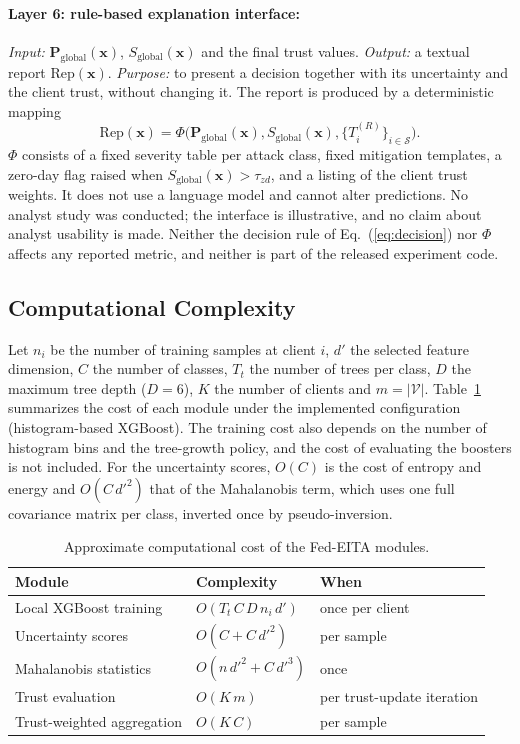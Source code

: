 \documentclass[pdflatex,sn-mathphys-num]{sn-jnl}
\begin{document}
{{\paragraph{Layer 6: rule-based explanation interface:} \emph{Input:} $\mathbf{P}_{\mathrm{global}}(\mathbf{x})$, $S_{\mathrm{global}}(\mathbf{x})$ and the final trust values. \emph{Output:} a textual report $\mathrm{Rep}(\mathbf{x})$. \emph{Purpose:} to present a decision together with its uncertainty and the client trust, without changing it. The report is produced by a deterministic mapping
\begin{equation}
\mathrm{Rep}(\mathbf{x})=\Phi\big(\mathbf{P}_{\mathrm{global}}(\mathbf{x}),S_{\mathrm{global}}(\mathbf{x}),\{T_i^{(R)}\}_{i\in\mathcal{S}}\big).\label{eq:phi}
\end{equation}
$\Phi$ consists of a fixed severity table per attack class, fixed mitigation templates, a zero-day flag raised when $S_{\mathrm{global}}(\mathbf{x})>\tau_{zd}$, and a listing of the client trust weights. It does not use a language model and cannot alter predictions. No analyst study was conducted; the interface is illustrative, and no claim about analyst usability is made. Neither the decision rule of Eq.~(\ref{eq:decision}) nor $\Phi$ affects any reported metric, and neither is part of the released experiment code.}
{\color{black}
\subsection{Computational Complexity}
Let $n_i$ be the number of training samples at client $i$, $d'$ the selected feature dimension, $C$ the number of classes, $T_t$ the number of trees per class, $D$ the maximum tree depth ($D=6$), $K$ the number of clients and $m=|\mathcal{V}|$. Table~\ref{tab:complexity} summarizes the cost of each module under the implemented configuration (histogram-based XGBoost). The training cost also depends on the number of histogram bins and the tree-growth policy, and the cost of evaluating the boosters is not included. For the uncertainty scores, $O(C)$ is the cost of entropy and energy and $O(C\,d'^2)$ that of the Mahalanobis term, which uses one full covariance matrix per class, inverted once by pseudo-inversion.

\begin{table}[!htbp]\centering
\color{black}
\caption{Approximate computational cost of the Fed-EITA modules.}\label{tab:complexity}
\footnotesize
\begin{tabular}{lll}\toprule
Module & Complexity & When \\ \midrule
Local XGBoost training & $O(T_t\,C\,D\,n_i\,d')$ & once per client \\
Uncertainty scores & $O(C+C\,d'^2)$ & per sample \\
Mahalanobis statistics & $O(n\,d'^2+C\,d'^3)$ & once \\
Trust evaluation & $O(K\,m)$ & per trust-update iteration \\
Trust-weighted aggregation & $O(K\,C)$ & per sample \\
\bottomrule\end{tabular}
\end{table}}

}
\end{document}
